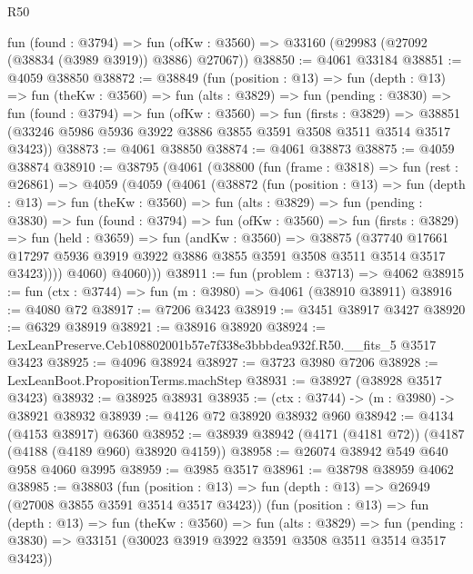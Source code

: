 \begin{lexlean}{R50}
\begin{coremodule}
    fun (found : @3794) =>
    fun (ofKw : @3560) => @33160 (@29983 (@27092 (@38834 (@3989 @3919)) @3886) @27067))
@38850 := @4061 @33184
@38851 := @4059 @38850
@38872 := @38849
    (fun (position : @13) =>
    fun (depth : @13) =>
    fun (theKw : @3560) =>
    fun (alts : @3829) =>
    fun (pending : @3830) =>
    fun (found : @3794) =>
    fun (ofKw : @3560) =>
    fun (firsts : @3829) =>
    @38851 (@33246 @5986 @5936 @3922 @3886 @3855 @3591 @3508 @3511 @3514 @3517 @3423))
@38873 := @4061 @38850
@38874 := @4061 @38873
@38875 := @4059 @38874
@38910 := @38795
    (@4061
      (@38800
        (fun (frame : @3818) =>
        fun (rest : @26861) =>
        @4059
          (@4059
            (@4061
              (@38872
                (fun (position : @13) =>
                fun (depth : @13) =>
                fun (theKw : @3560) =>
                fun (alts : @3829) =>
                fun (pending : @3830) =>
                fun (found : @3794) =>
                fun (ofKw : @3560) =>
                fun (firsts : @3829) =>
                fun (held : @3659) =>
                fun (andKw : @3560) =>
                @38875
                  (@37740
                    @17661
                    @17297
                    @5936
                    @3919
                    @3922
                    @3886
                    @3855
                    @3591
                    @3508
                    @3511
                    @3514
                    @3517
                    @3423))))
            @4060)
          @4060)))
@38911 := fun (problem : @3713) => @4062
@38915 := fun (ctx : @3744) => fun (m : @3980) => @4061 (@38910 @38911)
@38916 := @4080 @72
@38917 := @7206 @3423
@38919 := @3451 @38917 @3427
@38920 := @6329 @38919
@38921 := @38916 @38920
@38924 := LexLeanPreserve.Ceb108802001b57e7f338e3bbbdea932f.R50.__fits_5 @3517 @3423
@38925 := @4096 @38924
@38927 := @3723 @3980 @7206
@38928 := LexLeanBoot.PropositionTerms.machStep
@38931 := @38927 (@38928 @3517 @3423)
@38932 := @38925 @38931
@38935 := (ctx : @3744) -> (m : @3980) -> @38921 @38932
@38939 := @4126 @72 @38920 @38932 @960
@38942 := @4134 (@4153 @38917) @6360
@38952 := @38939 @38942 (@4171 (@4181 @72)) (@4187 (@4188 (@4189 @960) @38920 @4159))
@38958 := @26074 @38942 @549 @640 @958 @4060 @3995
@38959 := @3985 @3517
@38961 := @38798 @38959 @4062
@38985 := @38803
    (fun (position : @13) => fun (depth : @13) => @26949 (@27008 @3855 @3591 @3514 @3517 @3423))
    (fun (position : @13) =>
    fun (depth : @13) =>
    fun (theKw : @3560) =>
    fun (alts : @3829) =>
    fun (pending : @3830) => @33151 (@30023 @3919 @3922 @3591 @3508 @3511 @3514 @3517 @3423))

\end{coremodule}
\end{lexlean}
